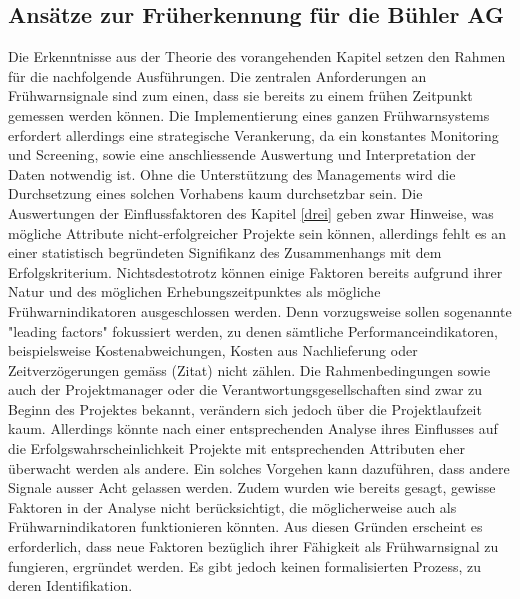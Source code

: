 

\subsection{Ansätze zur Früherkennung für die Bühler AG}\label{vierzwei}
Die Erkenntnisse aus der Theorie des vorangehenden Kapitel setzen den Rahmen für die nachfolgende Ausführungen. Die zentralen Anforderungen an Frühwarnsignale sind zum einen, dass sie bereits zu einem frühen Zeitpunkt gemessen werden können. Die Implementierung eines ganzen Frühwarnsystems erfordert allerdings eine strategische Verankerung, da ein konstantes Monitoring und Screening, sowie eine anschliessende Auswertung und Interpretation der Daten notwendig ist. Ohne die Unterstützung des Managements wird die Durchsetzung eines solchen Vorhabens kaum durchsetzbar sein.
Die Auswertungen der Einflussfaktoren des Kapitel \ref{drei} geben zwar Hinweise, was mögliche Attribute nicht-erfolgreicher Projekte sein können, allerdings fehlt es an einer statistisch begründeten Signifikanz des Zusammenhangs mit dem Erfolgskriterium. Nichtsdestotrotz können einige Faktoren bereits aufgrund ihrer Natur und des möglichen Erhebungszeitpunktes als mögliche Frühwarnindikatoren ausgeschlossen werden. Denn vorzugsweise sollen sogenannte "leading factors" fokussiert werden, zu denen sämtliche Performanceindikatoren, beispielsweise Kostenabweichungen, Kosten aus Nachlieferung oder Zeitverzögerungen gemäss (Zitat) nicht zählen. Die Rahmenbedingungen sowie auch der Projektmanager oder die Verantwortungsgesellschaften sind zwar zu Beginn des Projektes bekannt, verändern sich jedoch über die Projektlaufzeit kaum. Allerdings könnte nach einer entsprechenden Analyse ihres Einflusses auf die Erfolgswahrscheinlichkeit Projekte mit entsprechenden Attributen eher überwacht werden als andere. Ein solches Vorgehen kann dazuführen, dass andere Signale ausser Acht gelassen werden. Zudem wurden wie bereits gesagt, gewisse Faktoren in der Analyse nicht berücksichtigt, die möglicherweise auch als Frühwarnindikatoren funktionieren könnten. Aus diesen Gründen erscheint es erforderlich, dass neue Faktoren bezüglich ihrer Fähigkeit als Frühwarnsignal zu fungieren, ergründet werden. Es gibt jedoch keinen formalisierten Prozess, zu deren Identifikation. 
